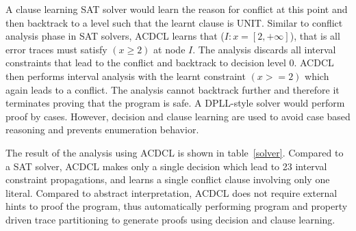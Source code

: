 A clause learning SAT solver would learn the reason for conflict at this 
point and then backtrack to a level such that the learnt clause is UNIT.  
Similar to conflict analysis phase in SAT solvers, ACDCL learns that 
(\(I: x = [2,+\infty]\)), that is all error traces must satisfy $(x \geq 2)$ 
at node $I$.  The analysis discards all interval constraints that
lead to the conflict and backtrack to decision level 0.  ACDCL then 
performs interval analysis with the learnt constraint $(x>=2)$ which again 
leads to a conflict.  The analysis cannot backtrack further and therefore 
it terminates proving that the program is safe.  A DPLL-style solver would 
perform proof by cases.  However, decision and clause learning are used 
to avoid case based reasoning and prevents enumeration behavior.     
   
The result of the analysis using ACDCL is shown in table~\ref{solver}.  
Compared to a SAT solver, ACDCL makes only a single decision which lead 
to 23 interval constraint propagations, and learns a single conflict clause 
involving only one literal.  Compared to abstract interpretation, ACDCL does 
not require external hints to proof the program, thus automatically performing 
program and property driven trace partitioning to generate proofs using decision 
and clause learning.  
